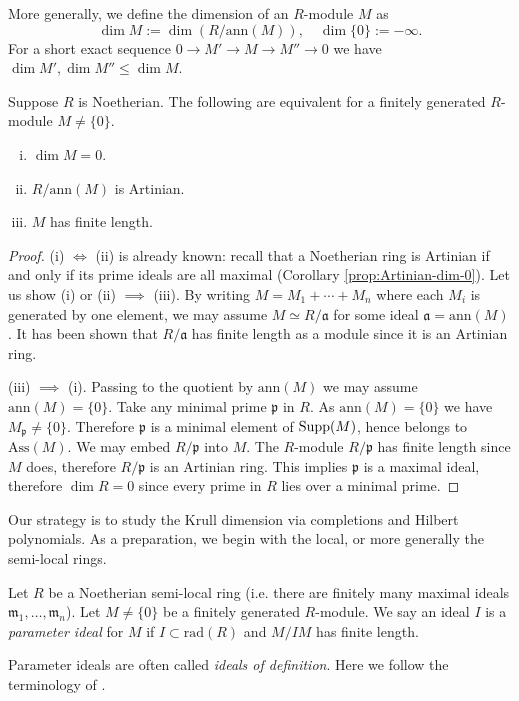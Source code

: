 More generally, we define the dimension of an $R$-module $M$ as
\[ \dim M := \dim(R/\text{ann}(M)), \quad \dim\{0\} := -\infty . \]
For a short exact sequence $0 \to M' \to M \to M'' \to 0$ we have $\dim M', \dim M'' \leq \dim M$.

\begin{lemma}\label{prop:dim-M-equiv}
	Suppose $R$ is Noetherian. The following are equivalent for a finitely generated $R$-module $M \neq \{0\}$.
	\begin{enumerate}[(i)]
		\item $\dim M = 0$.
		\item $R/\text{ann}(M)$ is Artinian.
		\item $M$ has finite length.
	\end{enumerate}
\end{lemma}
\begin{proof}
	(i) $\iff$ (ii) is already known: recall that a Noetherian ring is Artinian if and only if its prime ideals are all maximal (Corollary \ref{prop:Artinian-dim-0}). Let us show (i) or (ii) $\implies$ (iii). By writing $M = M_1 + \cdots + M_n$ where each $M_i$ is generated by one element,  we may assume $M \simeq R/\mathfrak{a}$ for some ideal $\mathfrak{a} = \text{ann}(M)$. It has been shown that $R/\mathfrak{a}$ has finite length as a module since it is an Artinian ring.
	
	(iii) $\implies$ (i). Passing to the quotient by $\text{ann}(M)$ we may assume $\text{ann}(M)=\{0\}$. Take any minimal prime $\mathfrak{p}$ in $R$. As $\text{ann}(M) = \{0\}$ we have $M_{\mathfrak{p}} \neq \{0\}$. Therefore $\mathfrak{p}$ is a minimal element of $\operatorname{Supp}(M)$, hence belongs to $\text{Ass}(M)$. We may embed $R/\mathfrak{p}$ into $M$. The $R$-module $R/\mathfrak{p}$ has finite length since $M$ does, therefore $R/\mathfrak{p}$ is an Artinian ring. This implies $\mathfrak{p}$ is a maximal ideal, therefore $\dim R = 0$ since every prime in $R$ lies over a minimal prime.
\end{proof}

Our strategy is to study the Krull dimension via completions and Hilbert polynomials. As a preparation, we begin with the local, or more generally the semi-local rings.

\begin{definition}
	Let $R$ be a Noetherian semi-local ring (i.e. there are finitely many maximal ideals $\mathfrak{m}_1, \ldots, \mathfrak{m}_n$). Let $M \neq \{0\}$ be a finitely generated $R$-module. We say an ideal $I$ is a \emph{parameter ideal} for $M$ if $I \subset \text{rad}(R)$ and $M/IM$ has finite length.
\end{definition}
Parameter ideals are often called \emph{ideals of definition}. Here we follow the terminology of \cite{Eis95}.

